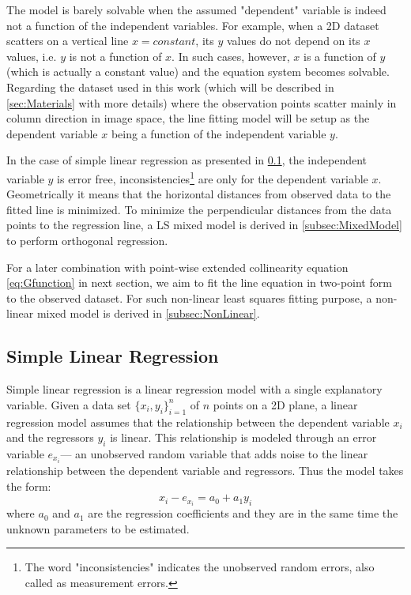 The model is barely solvable when the assumed "dependent" variable is indeed not a function of the independent variables. For example, when a 2D dataset scatters on a vertical line $x=constant$, its $y$ values do not depend on its $x$ values, i.e. $y$ is not a function of $x$. In such cases, however, $x$ is a function of $y$ (which is actually a constant value) and the equation system becomes solvable. Regarding the dataset used in this work (which will be described in \cref{sec:Materials} with more details) where the observation points scatter mainly in column direction in image space, the line fitting model will be setup as the dependent variable $x$ being a function of the independent variable $y$.


In the case of simple linear regression as presented in \cref{subsec:LinearRegression}, the independent variable $y$ is error free, inconsistencies\footnote{The word "inconsistencies" indicates the unobserved random errors, also called as measurement errors.} are only for the dependent variable $x$. Geometrically it means that the horizontal distances from observed data to the fitted line is minimized. To minimize the %
perpendicular distances from the data points to the regression line, a LS mixed model is derived in \cref{subsec:MixedModel} to perform orthogonal regression.

For a later combination with point-wise extended collinearity equation \eqref{eq:Gfunction} in next section, we aim to fit the line equation in two-point form to the observed dataset. 
For such non-linear least squares fitting purpose, a non-linear mixed model is derived in \cref{subsec:NonLinear}. 


\subsection{Simple Linear Regression}
\label{subsec:LinearRegression}
Simple linear regression is a linear regression model with a single explanatory variable. Given a data set $\{x_i,y_i\}^n_{i=1}$ of $n$ points on a 2D plane, a linear regression model assumes that the relationship between the dependent variable $x_i$ and the regressors $y_i$ is linear. This relationship is modeled through an error variable $e_{x_i}$--- an unobserved random variable that adds noise to the linear relationship between the dependent variable and regressors.
Thus the model takes the form:
\begin{equation} \label{eq:SimpleLinearRegression}
x_i - e_{x_i} = a_0 + a_1y_i
\end{equation}
where $a_0$ and $a_1$ are the regression coefficients and they are in the same time the unknown parameters to be estimated.


